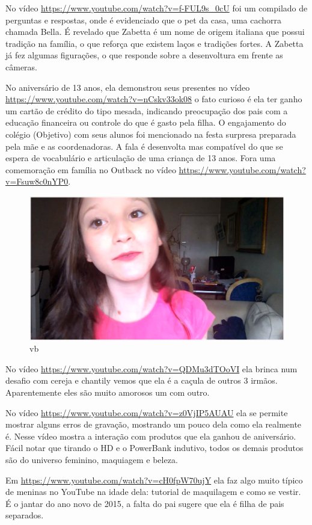 No vídeo \url{https://www.youtube.com/watch?v=f-FUL9s_0cU} foi um compilado de perguntas e respostas, onde é evidenciado que o pet da casa, uma cachorra chamada Bella. É revelado que Zabetta é um nome de origem italiana que possui tradição na família, o que reforça que existem laços e tradições fortes. A Zabetta já fez algumas figurações, o que responde sobre a desenvoltura em frente as câmeras.

No aniversário de 13 anos, ela demonstrou seus presentes no vídeo \url{https://www.youtube.com/watch?v=nCskv33ok08} o fato curioso é ela ter ganho um cartão de crédito do tipo mesada, indicando preocupação dos pais com a educação financeira ou controle do que é gasto pela filha. O engajamento do colégio (Objetivo) com seus alunos foi mencionado na festa surpresa preparada pela mãe e as coordenadoras. A fala é desenvolta mas compatível do que se espera de vocabulário e articulação de uma criança de 13 anos. Fora uma comemoração em família no Outback no vídeo \url{https://www.youtube.com/watch?v=Fsuw8c0nYP0}.

\begin{figure}
    \centering
    \includegraphics[width=0.7\linewidth]{fig/Zabetta-13-anos}
    \caption{vb}
    \label{fig:zabetta-13-anos}
\end{figure}


No vídeo \url{https://www.youtube.com/watch?v=QDMu3dTOoVI} ela brinca num desafio com cereja e chantily vemos que ela é a caçula de outros 3 irmãos. Aparentemente eles são muito amorosos um com outro.

No vídeo \url{https://www.youtube.com/watch?v=z0VjIP5AUAU} ela se permite mostrar alguns erros de gravação, mostrando um pouco dela como ela realmente é. Nesse vídeo mostra a interação com produtos que ela ganhou de aniversário. Fácil notar que tirando o HD e o PowerBank indutivo, todos os demais produtos são do universo feminino, maquiagem e beleza.



Em \url{https://www.youtube.com/watch?v=cH0fpW70ujY} ela faz algo muito típico de meninas no YouTube na idade dela: tutorial de maquilagem e como se vestir. É o jantar do ano novo de 2015, a falta do pai sugere que ela é filha de pais separados.

